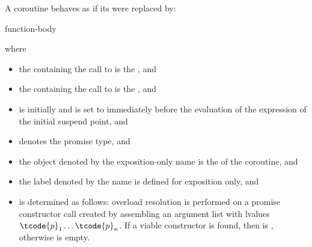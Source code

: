 \pnum
A coroutine behaves as if its  were replaced by:
\begin{ncsimplebnf}
\terminal{\{}\br
\bnfindent {}   \terminal{;}\br
\bnfindent {} \terminal{\{}\br
\bnfindent\bnfindent {}  \terminal{;}\br
\bnfindent\bnfindent function-body\br
\bnfindent {}\br
\bnfindent\bnfindent {}\br
\bnfindent\bnfindent\bnfindent {} \terminal{;}\br
\bnfindent\bnfindent {} \terminal{;}\br
\bnfindent \terminal{\}}\br
{} \terminal{:}\br
\bnfindent {}  \terminal{;}\br
\terminal{\}}
\end{ncsimplebnf}
where
\begin{itemize}
\item
the  containing
the call to 
is the , and
\item
the  containing
the call to 
is the , and
\item
{}
is initially  and is set to 
immediately before the evaluation
of the  expression
of the initial suspend point, and
\item
{} denotes the promise type, and
\item
the object denoted by the exposition-only name 
is the  of the coroutine, and
\item
the label denoted by the name 
is defined for exposition only, and
\item
{} is determined as follows:
overload resolution is performed on a promise constructor call created by
assembling an argument list with lvalues $\tcode{p}_1 \dotsc \tcode{p}_n$. If a viable
constructor is found, then
 is
, otherwise
 is empty.
\end{itemize}

